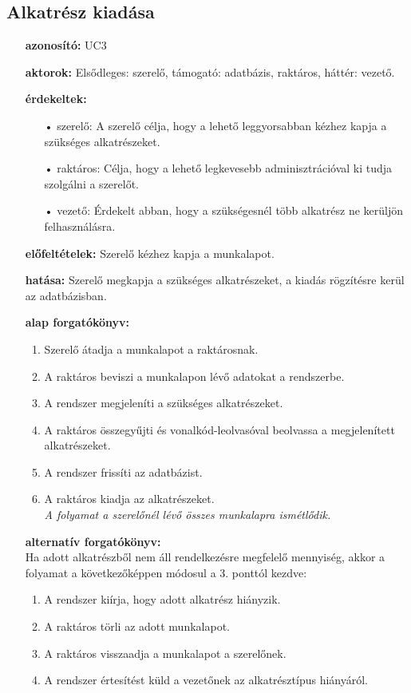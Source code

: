 \documentclass[12pt]{article}\usepackage[left=20mm,right=20mm,top=15mm,bottom=20mm]{geometry}
\begin{document}
\subsection{Alkatrész kiadása}
\begin{itemize}
\item[] \textbf{azonosító: } UC3
\item[] \textbf{aktorok: } Elsődleges: szerelő, támogató: adatbázis, raktáros, háttér: vezető.

\item[] \textbf{érdekeltek: }
\vspace*{-3mm}
\begin{itemize}
\item[•] szerelő: A szerelő célja, hogy a lehető leggyorsabban kézhez kapja a szükséges alkatrészeket.
\item[•] raktáros: Célja, hogy a lehető legkevesebb adminisztrációval ki tudja szolgálni a szerelőt.
\item[•] vezető: Érdekelt abban, hogy a szükségesnél több alkatrész ne kerüljön felhasználásra.
\end{itemize}

\item[] \textbf{előfeltételek: } Szerelő kézhez kapja a munkalapot.

\item[] \textbf{hatása: } Szerelő megkapja a szükséges alkatrészeket, a kiadás rögzítésre kerül az adatbázisban.

\item[] \textbf{alap forgatókönyv: }
\begin{enumerate}
\item Szerelő átadja a munkalapot a raktárosnak.
\item A raktáros beviszi a munkalapon lévő adatokat a rendszerbe.
\item A rendszer megjeleníti a szükséges alkatrészeket.
\item A raktáros összegyűjti és vonalkód-leolvasóval beolvassa a megjelenített alkatrészeket.
\item A rendszer frissíti az adatbázist.
\item A raktáros kiadja az alkatrészeket. \\
\textit{A folyamat a szerelőnél lévő összes munkalapra ismétlődik.}
\end{enumerate}

\item[] \textbf{alternatív forgatókönyv:} \\
Ha adott alkatrészből nem áll rendelkezésre megfelelő mennyiség, akkor a folyamat a következőképpen módosul a 3. ponttól kezdve:
\begin{enumerate}
\item A rendszer kiírja, hogy adott alkatrész hiányzik.
\item A raktáros törli az adott munkalapot.
\item A raktáros visszaadja a munkalapot a szerelőnek.
\item A rendszer értesítést küld a vezetőnek az alkatrésztípus hiányáról.
\end{enumerate}


\end{itemize}
\end{document}
